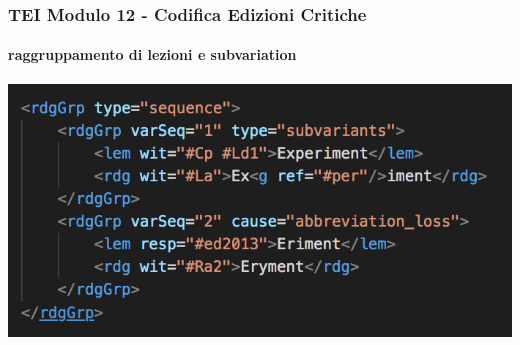 \begin{frame}
    \frametitle{TEI Modulo 12 - Codifica Edizioni Critiche}
    \framesubtitle{raggruppamento di lezioni e subvariation}
    \addtocounter{nframe}{1}
    


    \begin{center}
        \includegraphics[width=.95\textwidth]{imgs/rdgGrp-seq.png}
    \end{center}


\end{frame}





















